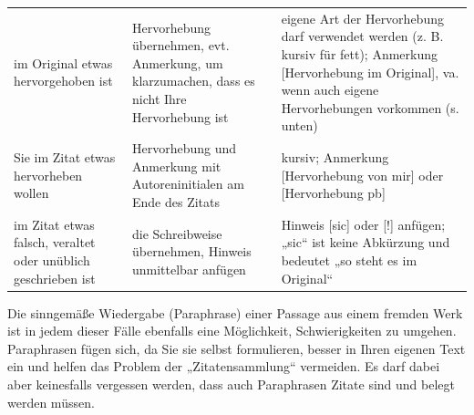\documentclass[]{book}
\theoremstyle{definition}
\theoremstyle{definition}
\theoremstyle{definition}
\theoremstyle{remark}
\begin{document}
\begin{longtable}[]{@{}lll@{}}
\begin{minipage}[t]{0.25\columnwidth}\raggedright\strut
im Original etwas hervorgehoben ist\strut
\end{minipage} & \begin{minipage}[t]{0.34\columnwidth}\raggedright\strut
Hervorhebung übernehmen, evt. Anmerkung, um klarzumachen, dass es nicht
Ihre Hervorhebung ist\strut
\end{minipage} & \begin{minipage}[t]{0.32\columnwidth}\raggedright\strut
eigene Art der Hervorhebung darf verwendet werden (z. B. kursiv für
fett); Anmerkung {[}Hervorhebung im Original{]}, va. wenn auch eigene
Hervorhebungen vorkommen (s. unten) \vspace{-6mm}\strut
\end{minipage}\tabularnewline
\begin{minipage}[t]{0.25\columnwidth}\raggedright\strut
Sie im Zitat etwas hervorheben wollen\strut
\end{minipage} & \begin{minipage}[t]{0.34\columnwidth}\raggedright\strut
Hervorhebung und Anmerkung mit Autoreninitialen am Ende des Zitats\strut
\end{minipage} & \begin{minipage}[t]{0.32\columnwidth}\raggedright\strut
kursiv; Anmerkung {[}Hervorhebung von mir{]} oder {[}Hervorhebung pb{]}
\vspace{-6mm}\strut
\end{minipage}\tabularnewline
\begin{minipage}[t]{0.25\columnwidth}\raggedright\strut
im Zitat etwas falsch, veraltet oder unüblich geschrieben ist\strut
\end{minipage} & \begin{minipage}[t]{0.34\columnwidth}\raggedright\strut
die Schreibweise übernehmen, Hinweis unmittelbar anfügen\strut
\end{minipage} & \begin{minipage}[t]{0.32\columnwidth}\raggedright\strut
Hinweis {[}sic{]} oder {[}!{]} anfügen; „sic`` ist keine Abkürzung und
bedeutet „so steht es im Original``\strut
\end{minipage}\tabularnewline
\bottomrule
\end{longtable}

Die sinngemäße Wiedergabe (Paraphrase) einer Passage aus einem fremden
Werk ist in jedem dieser Fälle ebenfalls eine Möglichkeit,
Schwierigkeiten zu umgehen. Paraphrasen fügen sich, da Sie sie selbst
formulieren, besser in Ihren eigenen Text ein und helfen das Problem der
„Zitatensammlung`` vermeiden. Es darf dabei aber keinesfalls vergessen
werden, dass auch Paraphrasen Zitate sind und belegt werden müssen.
\end{document}
